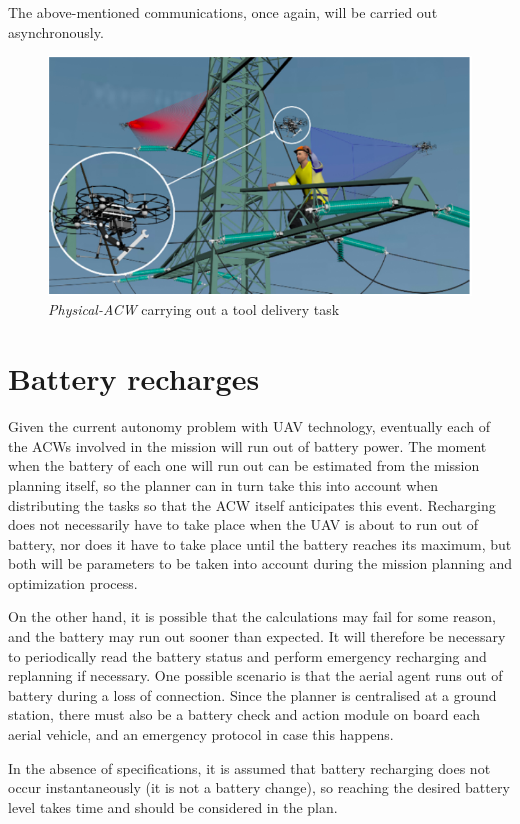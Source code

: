 The above-mentioned communications, once again, will be carried out asynchronously. 


\begin{figure}[htbp]
    \centering
    \includegraphics[width=0.8\linewidth]
    {ProblemFormulation/figures/deliver_task.png}
    \caption{\textit{Physical-ACW} carrying out a tool delivery task}
    \label{fig:deliver_task}
\end{figure}

\section{Battery recharges}
\label{sec:BatteryRecharges}
Given the current autonomy problem with \gls{UAV} technology, eventually each of the \glspl{ACW} involved in the mission will run out of battery power. The moment when the battery of each one will run out can be estimated from the mission planning itself, so the planner can in turn take this into account when distributing the tasks so that the \gls{ACW} itself anticipates this event. Recharging does not necessarily have to take place when the \gls{UAV} is about to run out of battery, nor does it have to take place until the battery reaches its maximum, but both will be parameters to be taken into account during the mission planning and optimization process.

On the other hand, it is possible that the calculations may fail for some reason, and the battery may run out sooner than expected. It will therefore be necessary to periodically read the battery status and perform emergency recharging and replanning if necessary. One possible scenario is that the aerial agent runs out of battery during a loss of connection. Since the planner is centralised at a ground station, there must also be a battery check and action module on board each aerial vehicle, and an emergency protocol in case this happens.

In the absence of specifications, it is assumed that battery recharging does not occur instantaneously (it is not a battery change), so reaching the desired battery level takes time and should be considered in the plan.

